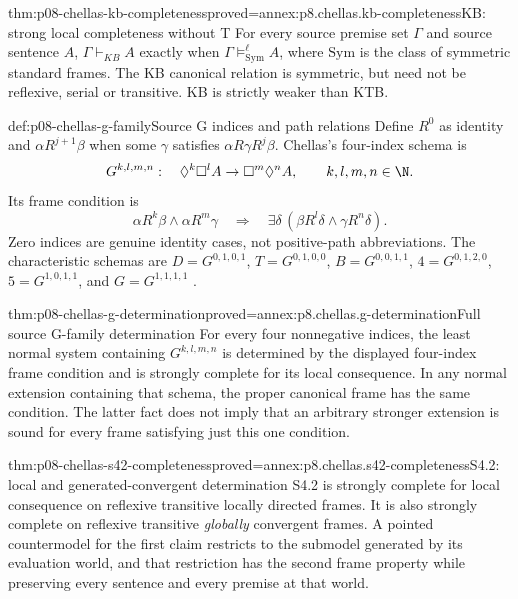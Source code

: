 \begin{hbtheorem}{thm:p08-chellas-kb-completeness}{proved=annex:p8.chellas.kb-completeness}{KB: strong local completeness without T}
For every source premise set \(\Gamma\) and source sentence \(A\),
\(\Gamma\vdash_{KB}A\) exactly when
\(\Gamma\models_{\mathrm{Sym}}^\ell A\), where
\(\mathrm{Sym}\) is the class of symmetric standard frames.
The KB canonical relation is symmetric, but need not be reflexive,
serial or transitive. KB is strictly weaker than KTB.
\end{hbtheorem}

\begin{hbdefinition}{def:p08-chellas-g-family}{Source G indices and path relations}
Define \(R^0\) as identity and \(\alpha R^{j+1}\beta\) when some
\(\gamma\) satisfies \(\alpha R\gamma R^j\beta\).
Chellas's four-index schema is
\[
 G^{k,l,m,n}:\quad
 \Diamond^k\Box^l A\to\Box^m\Diamond^n A,
 \qquad k,l,m,n\in\N.
\]
Its frame condition is
\[
 \alpha R^k\beta\land\alpha R^m\gamma
 \quad\Longrightarrow\quad
 \exists\delta\,(\beta R^l\delta\land\gamma R^n\delta).
\]
Zero indices are genuine identity cases, not positive-path abbreviations.
The characteristic schemas are
\(D=G^{0,1,0,1}\), \(T=G^{0,1,0,0}\),
\(B=G^{0,0,1,1}\), \(4=G^{0,1,2,0}\),
\(5=G^{1,0,1,1}\), and \(G=G^{1,1,1,1}\)
\cite[\S3.3]{Chellas1980}.
\end{hbdefinition}

\begin{hbtheorem}{thm:p08-chellas-g-determination}{proved=annex:p8.chellas.g-determination}{Full source G-family determination}
For every four nonnegative indices, the least normal system containing
\(G^{k,l,m,n}\) is determined by the displayed four-index frame
condition and is strongly complete for its local consequence.
In any normal extension containing that schema, the proper canonical
frame has the same condition. The latter fact does not imply that an
arbitrary stronger extension is sound for every frame satisfying just
this one condition.
\end{hbtheorem}

\begin{hbtheorem}{thm:p08-chellas-s42-completeness}{proved=annex:p8.chellas.s42-completeness}{S4.2: local and generated-convergent determination}
S4.2 is strongly complete for local consequence on reflexive transitive
locally directed frames. It is also strongly complete on reflexive
transitive \emph{globally} convergent frames. A pointed countermodel
for the first claim restricts to the submodel generated by its evaluation
world, and that restriction has the second frame property while
preserving every sentence and every premise at that world.
\end{hbtheorem}

